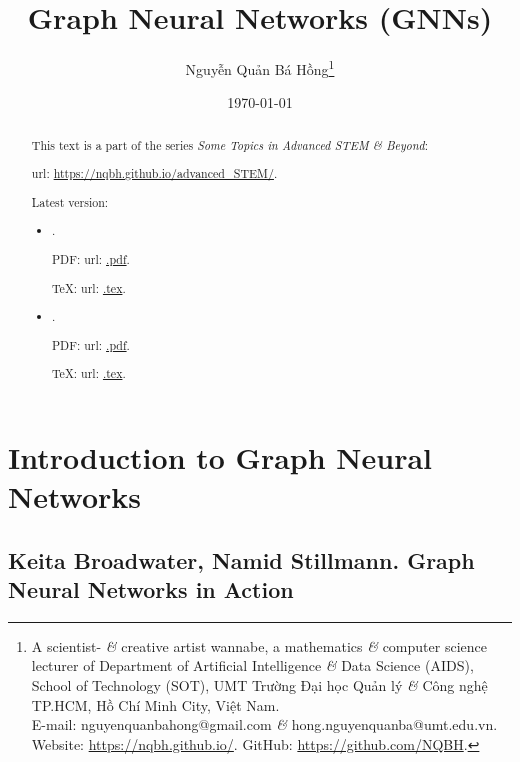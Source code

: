 \documentclass{article}
\title{Graph Neural Networks (GNNs)}
\author{Nguyễn Quản Bá Hồng\footnote{A scientist- {\it\&} creative artist wannabe, a mathematics {\it\&} computer science lecturer of Department of Artificial Intelligence {\it\&} Data Science (AIDS), School of Technology (SOT), UMT Trường Đại học Quản lý {\it\&} Công nghệ TP.HCM, Hồ Chí Minh City, Việt Nam.\\E-mail: {\sf nguyenquanbahong@gmail.com} {\it\&} {\sf hong.nguyenquanba@umt.edu.vn}. Website: \url{https://nqbh.github.io/}. GitHub: \url{https://github.com/NQBH}.}}
\date{\today}
\begin{document}
\maketitle
\begin{abstract}
    This text is a part of the series {\it Some Topics in Advanced STEM \& Beyond}:

    {\sc url}: \url{https://nqbh.github.io/advanced_STEM/}.

    Latest version:
    \begin{itemize}
        \item {\it }.

        PDF: {\sc url}: \url{.pdf}.

        \TeX: {\sc url}: \url{.tex}.
        \item {\it }.

        PDF: {\sc url}: \url{.pdf}.

        \TeX: {\sc url}: \url{.tex}.
    \end{itemize}
\end{abstract}
\tableofcontents


\section{Introduction to Graph Neural Networks}


\subsection{{\sc Keita Broadwater, Namid Stillmann}. Graph Neural Networks in Action}
\end{document}
